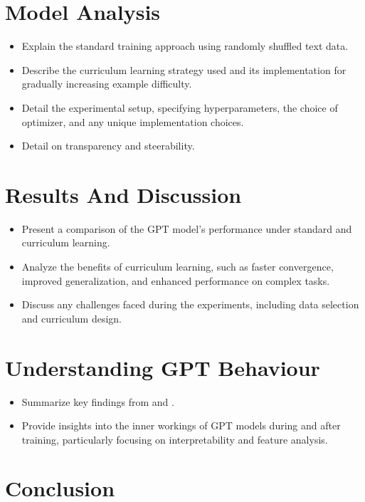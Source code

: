 \documentclass[12pt]{article}
\theoremstyle{plain}
\theoremstyle{definition}
\theoremstyle{remark}
\begin{document}
\section{Model Analysis}
\label{sec:model_analysis}

\begin{itemize}
  \item Explain the standard training approach using randomly shuffled text data.
  \item Describe the curriculum learning strategy used and its implementation for gradually increasing example difficulty.
  \item Detail the experimental setup, specifying hyperparameters, the choice of optimizer, and any unique implementation choices.
  \item Detail on transparency and steerability.
\end{itemize}

\section{Results And Discussion}
\label{sec:result_discussion}

\begin{itemize}
  \item Present a comparison of the GPT model's performance under standard and curriculum learning.
  \item Analyze the benefits of curriculum learning, such as faster convergence, improved generalization, and enhanced performance on complex tasks.
  \item Discuss any challenges faced during the experiments, including data selection and curriculum design.
\end{itemize}

\section{Understanding GPT Behaviour}
\label{sec:gpt_behaviour}

\begin{itemize}
  \item Summarize key findings from \cite{meng2023locating} and \cite{cunningham2023sparse}.
  \item Provide insights into the inner workings of GPT models during and after training, particularly focusing on interpretability and feature analysis.
\end{itemize}

\section{Conclusion}
\label{sec:concl}
\end{document}
